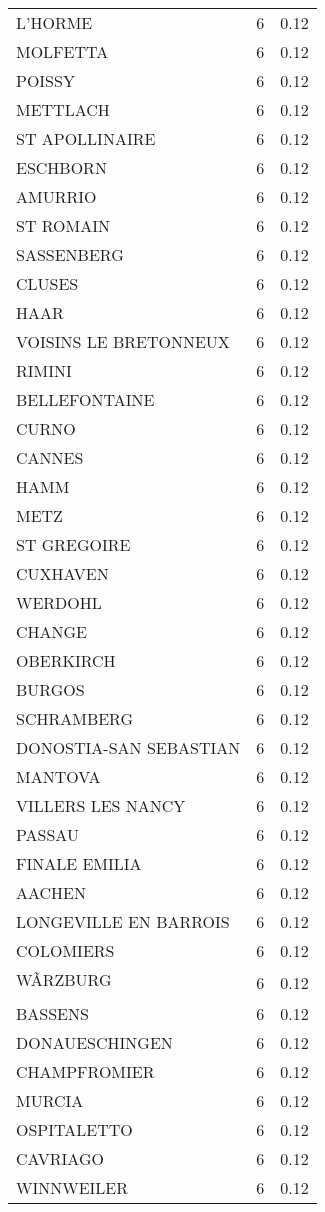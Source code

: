 \begin{table*}[htbp]
\begin{tabular}{lrr}
L'HORME & 6 & 0.12 \\
MOLFETTA & 6 & 0.12 \\
POISSY & 6 & 0.12 \\
METTLACH & 6 & 0.12 \\
ST APOLLINAIRE & 6 & 0.12 \\
ESCHBORN & 6 & 0.12 \\
AMURRIO & 6 & 0.12 \\
ST ROMAIN & 6 & 0.12 \\
SASSENBERG & 6 & 0.12 \\
CLUSES & 6 & 0.12 \\
HAAR & 6 & 0.12 \\
VOISINS LE BRETONNEUX & 6 & 0.12 \\
RIMINI & 6 & 0.12 \\
BELLEFONTAINE & 6 & 0.12 \\
CURNO & 6 & 0.12 \\
CANNES & 6 & 0.12 \\
HAMM & 6 & 0.12 \\
METZ & 6 & 0.12 \\
ST GREGOIRE & 6 & 0.12 \\
CUXHAVEN & 6 & 0.12 \\
WERDOHL & 6 & 0.12 \\
CHANGE & 6 & 0.12 \\
OBERKIRCH & 6 & 0.12 \\
BURGOS & 6 & 0.12 \\
SCHRAMBERG & 6 & 0.12 \\
DONOSTIA-SAN SEBASTIAN & 6 & 0.12 \\
MANTOVA & 6 & 0.12 \\
VILLERS LES NANCY & 6 & 0.12 \\
PASSAU & 6 & 0.12 \\
FINALE EMILIA & 6 & 0.12 \\
AACHEN & 6 & 0.12 \\
LONGEVILLE EN BARROIS & 6 & 0.12 \\
COLOMIERS & 6 & 0.12 \\
WÃRZBURG & 6 & 0.12 \\
BASSENS & 6 & 0.12 \\
DONAUESCHINGEN & 6 & 0.12 \\
CHAMPFROMIER & 6 & 0.12 \\
MURCIA & 6 & 0.12 \\
OSPITALETTO & 6 & 0.12 \\
CAVRIAGO & 6 & 0.12 \\
WINNWEILER & 6 & 0.12 \\

\end{tabular}
\end{table*}
